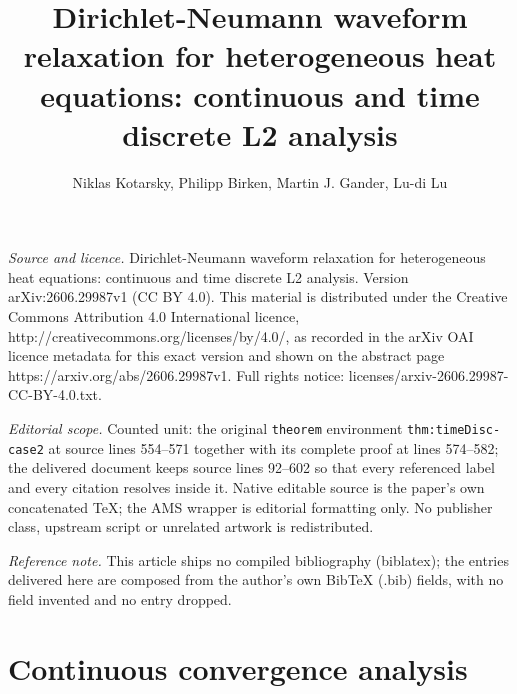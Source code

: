 \documentclass[10pt,a4paper]{amsart}
\begin{document}
\title[Dirichlet-Neumann waveform relaxation for heterogeneous heat]{Dirichlet-Neumann waveform relaxation for heterogeneous heat equations: continuous and time discrete L2 analysis}
\author{Niklas Kotarsky, Philipp Birken, Martin J. Gander, Lu-di Lu}
\date{}
\maketitle
\noindent\emph{Source and licence.} Dirichlet-Neumann waveform relaxation for heterogeneous heat equations: continuous and time discrete L2 analysis. Version arXiv:2606.29987v1 (CC BY 4.0). This material is distributed under the Creative Commons Attribution 4.0 International licence, http://creativecommons.org/licenses/by/4.0/, as recorded in the arXiv OAI licence metadata for this exact version and shown on the abstract page https://arxiv.org/abs/2606.29987v1. Full rights notice: licenses/arxiv-2606.29987-CC-BY-4.0.txt.\par\smallskip
\noindent\textit{Editorial scope.} Counted unit: the original \texttt{theorem} environment \texttt{thm:timeDisc-case2} at source lines 554--571 together with its complete proof at lines 574--582; the delivered document keeps source lines 92--602 so that every referenced label and every citation resolves inside it. Native editable source is the paper's own concatenated TeX; the AMS wrapper is editorial formatting only. No publisher class, upstream script or unrelated artwork is redistributed.
\par\smallskip\noindent\textit{Reference note.} This article ships no compiled bibliography (biblatex); the entries delivered here are composed from the author's own BibTeX (.bib) fields, with no field invented and no entry dropped.
\section{Continuous convergence analysis}\label{sec:2}
	
\end{document}
